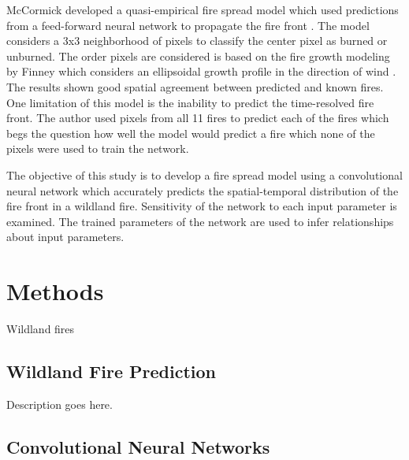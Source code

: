 
McCormick developed a quasi-empirical fire spread model which used predictions
from a feed-forward neural network to propagate the fire front \cite{mccormick2001toward,mccormick2002developing}.
The model considers a 3x3 neighborhood of pixels to classify the center pixel as burned
or unburned. The order pixels are considered is based on the fire growth
modeling by Finney which considers an ellipsoidal growth profile in the direction of wind
\cite{finney1999mechanistic}. The results shown good spatial agreement between predicted and
known fires. One limitation of this model is the inability to predict the time-resolved
fire front. The author used pixels from all 11 fires to predict each of the fires which
begs the question how well the model would predict a fire which none of the pixels were
used to train the network.


The objective of this study is to develop a fire spread model using a convolutional
neural network which accurately predicts the spatial-temporal distribution of the
fire front in a wildland fire. Sensitivity of the network to each input parameter is 
examined. The trained parameters of the network are used to
infer relationships about input parameters. 






\section{Methods}
\label{s:Methods}

Wildland fires


\subsection{Wildland Fire Prediction}
\label{ss:Wfp}

Description goes here.


\subsection{Convolutional Neural Networks}
\label{ss:Cnn}

